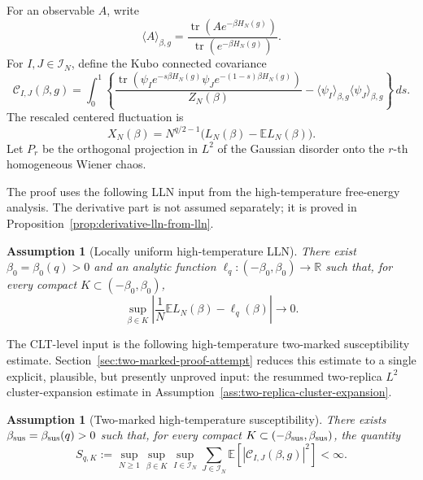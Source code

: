 \documentclass[11pt]{article}
\newtheorem{assumption}[theorem]{Assumption}
\newcommand{\E}{\mathbb{E}}
\newcommand{\tr}{\operatorname{tr}}
\newcommand{\R}{\mathbb{R}}
\newcommand{\calI}{\mathcal{I}}
\newcommand{\dd}{\,d}
\begin{document}
For an observable $A$, write
\begin{equation}\label{eq:thermal-average}
  \langle A\rangle_{\beta,g}
  =
  \frac{\tr(Ae^{-\beta H_N(g)})}{\tr(e^{-\beta H_N(g)})}.
\end{equation}
For $I,J\in\calI_N$, define the Kubo connected covariance
\begin{equation}\label{eq:kubo-covariance}
  \mathcal C_{I,J}(\beta,g)
  =
  \int_0^1
  \left\{
    \frac{
      \tr\left(\psi_I e^{-s\beta H_N(g)}
      \psi_J e^{-(1-s)\beta H_N(g)}\right)
    }{Z_N(\beta)}
    -
    \langle\psi_I\rangle_{\beta,g}
    \langle\psi_J\rangle_{\beta,g}
  \right\}
  \dd s.
\end{equation}
The rescaled centered fluctuation is
\begin{equation}\label{eq:Xn}
  X_N(\beta)=N^{q/2-1}\bigl(L_N(\beta)-\E L_N(\beta)\bigr).
\end{equation}
Let $P_r$ be the orthogonal projection in $L^2$ of the Gaussian disorder onto
the $r$-th homogeneous Wiener chaos.

The proof uses the following LLN input from the high-temperature free-energy
analysis.  The derivative part is not assumed separately; it is proved in
Proposition~\ref{prop:derivative-lln-from-lln}.

\begin{assumption}[Locally uniform high-temperature LLN]\label{ass:local-lln}
  There exist $\beta_0=\beta_0(q)>0$ and an analytic function
  $\ell_q:(-\beta_0,\beta_0)\to\R$ such that, for every compact
  $K\subset(-\beta_0,\beta_0)$,
  \begin{equation}\label{eq:local-lln}
    \sup_{\beta\in K}
    \left|
      \frac1N\E L_N(\beta)-\ell_q(\beta)
    \right|\to0.
  \end{equation}
\end{assumption}

The CLT-level input is the following high-temperature two-marked susceptibility
estimate.  Section~\ref{sec:two-marked-proof-attempt} reduces this estimate to
a single explicit, plausible, but presently unproved input: the resummed
two-replica $L^2$ cluster-expansion estimate in
Assumption~\ref{ass:two-replica-cluster-expansion}.

\begin{assumption}[Two-marked high-temperature susceptibility]
  \label{ass:two-marked-susceptibility}
  There exists $\beta_{\rm sus}=\beta_{\rm sus}(q)>0$ such that, for every
  compact $K\subset(-\beta_{\rm sus},\beta_{\rm sus})$, the quantity
  \begin{equation}\label{eq:two-marked-susceptibility}
    S_{q,K}
    :=
    \sup_{N\geq1}
    \sup_{\beta\in K}
    \sup_{I\in\calI_N}
    \sum_{J\in\calI_N}
    \E\left[
      \left|
        \mathcal C_{I,J}(\beta,g)
      \right|^2
    \right]
    <\infty.
  \end{equation}
\end{assumption}
\end{document}
